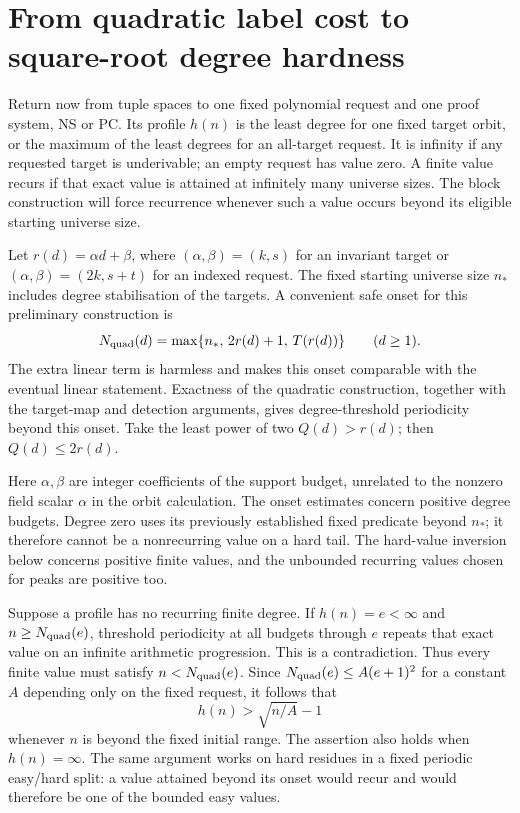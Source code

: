 \documentclass[11pt,a4paper,oneside,openany]{book}
\theoremstyle{definition}\newtheorem{definition}[theorem]{Definition}
\theoremstyle{remark}\newtheorem{remark}[theorem]{Remark}
\numberwithin{equation}{chapter}
\begin{document}
\section{From quadratic label cost to square-root degree hardness}
Return now from tuple spaces to one fixed polynomial request and one
proof system, NS or PC. Its profile $h(n)$ is the least degree for
one fixed target orbit, or the maximum of the least degrees for an
all-target request. It is infinity if any requested target is
underivable; an empty request has value zero. A finite value recurs if that exact value is
attained at infinitely many universe sizes. The block construction
will force recurrence whenever such a value occurs beyond its
eligible starting universe size.

Let $r(d)=\alpha d+\beta$, where
$(\alpha,\beta)=(k,s)$ for an invariant target or
$(\alpha,\beta)=(2k,s+t)$ for an indexed request. The fixed starting
universe size $n_*$ includes degree stabilisation of the targets. A convenient
safe onset for this preliminary construction is
\[
 N_{\rm quad}(d)=
  \max\{n_*,\,2r(d)+1,\,T(r(d))\}\qquad(d\ge1).
\]
The extra linear term is harmless and makes this onset comparable
with the eventual linear statement. Exactness of the quadratic
construction, together with the target-map and detection arguments,
gives degree-threshold periodicity beyond this onset. Take the least
power of two $Q(d)>r(d)$; then $Q(d)\le2r(d)$.

Here $\alpha,\beta$ are integer coefficients of the support budget,
unrelated to the nonzero field scalar $\alpha$ in the orbit
calculation. The onset estimates concern positive degree budgets.
Degree zero uses its previously established fixed predicate beyond
$n_*$; it therefore cannot be a nonrecurring value on a hard tail.
The hard-value inversion below concerns positive finite values,
and the unbounded recurring values chosen for peaks are positive too.

Suppose a profile has no recurring finite degree. If $h(n)=e<\infty$
and $n\ge N_{\rm quad}(e)$, threshold periodicity at all budgets
through $e$ repeats that exact value on an infinite arithmetic
progression. This is a contradiction. Thus every finite value must
satisfy $n<N_{\rm quad}(e)$. Since
$N_{\rm quad}(e)\le A(e+1)^2$ for a constant $A$ depending only
on the fixed request, it follows that
\[
                          h(n)>\sqrt{n/A}-1
\]
whenever $n$ is beyond the fixed initial range. The assertion also
holds when $h(n)=\infty$. The same argument works on hard residues
in a fixed periodic easy/hard split: a value attained beyond its
onset would recur and would therefore be one of the bounded easy
values.
\end{document}
